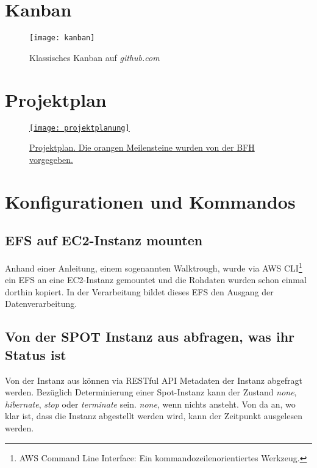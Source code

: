 \section{Kanban}\label{appendix:kanban}
\begin{figure}[H]
	\centering
	\texttt{[image: kanban]}
	\caption{Klassisches Kanban auf \emph{github.com}}
	\label{fig:Klassisches Kanban}
\end{figure}

\section{Projektplan}\label{appendix:projektplan}
\begin{figure}[H]
	\centering
	\href{https://docs.google.com/spreadsheets/d/1zKTZgt4BW736G0xRfU9o3vWYwAJj-8nzFvGsPR7yJ_0/edit?usp=sharing}{
	\texttt{[image: projektplanung]}}
	\caption{\href{https://docs.google.com/spreadsheets/d/1zKTZgt4BW736G0xRfU9o3vWYwAJj-8nzFvGsPR7yJ_0/edit?usp=sharing}{Projektplan. Die orangen Meilensteine wurden von der BFH vorgegeben.}}
	\label{fig:Projektplan}
\end{figure}

\section{Konfigurationen und Kommandos}
\subsection{EFS auf EC2-Instanz mounten}
Anhand einer Anleitung, einem sogenannten Walktrough, wurde via AWS CLI\footnote{AWS Command Line Interface: Ein kommandozeilenorientiertes Werkzeug.} ein
EFS an eine EC2-Instanz gemountet und die Rohdaten wurden schon einmal dorthin kopiert. In der Verarbeitung bildet dieses EFS den Ausgang der Datenverarbeitung.


\subsection{Von der SPOT Instanz aus abfragen, was ihr Status ist}\label{appendix:restful}
Von der Instanz aus können via RESTful API Metadaten der Instanz abgefragt werden. Bezüglich Determinierung einer Spot-Instanz kann der Zustand \emph{none}, \emph{hibernate}, \emph{stop} oder \emph{terminate} sein. \emph{none}, wenn nichts ansteht. Von da an, wo klar ist, dass die Instanz abgestellt werden wird, kann der Zeitpunkt ausgelesen werden.

